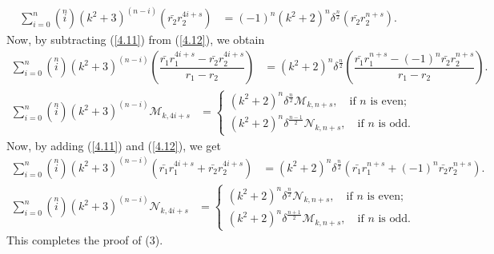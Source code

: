 \begin{align}\label{4.12}
\sum\limits_{i=0}^{n}\left( \stackrel{n}{i}\right)(k^2+3)^{(n-i)}(\bar{r_{2}}r_2^{4i+s})&=(-1)^n(k^2+2)^n\delta^{\frac{n}{2}}(\bar{r_{2}}r_2^{n+s}).
\end{align}
Now, by subtracting (\ref{4.11}) from (\ref{4.12}), we obtain \\
\begin{align*}
\sum\limits_{i=0}^{n}\left( \stackrel{n}{i}\right)(k^2+3)^{(n-i)}(\dfrac{\bar{r_{1}}r_1^{4i+s}-\bar{r_{2}}r_2^{4i+s}}{r_1-r_2})&=(k^2+2)^n\delta^{\frac{n}{2}}(\dfrac{\bar{r_{1}}r_1^{n+s}-(-1)^n\bar{r_{2}}r_2^{n+s}}{r_1-r_2}).
\end{align*}
\begin{align*}
\sum\limits_{i=0}^{n}\left( \stackrel{n}{i}\right)(k^2+3)^{(n-i)}\mathcal{M}_{k,4i+s}&=\begin{cases} 
(k^2+2)^n\delta^{\frac{n}{2}}\mathcal{M}_{k,n+s},\quad \text{if $n$ is even;}\\
(k^2+2)^n\delta^{\frac{n-1}{2}}\mathcal{N}_{k,n+s},\quad \text{if $n$ is odd.}\end{cases} 
\end{align*}
Now, by adding (\ref{4.11}) and (\ref{4.12}), we get \\
\begin{align*}
\sum\limits_{i=0}^{n}\left( \stackrel{n}{i}\right)(k^2+3)^{(n-i)}(\bar{r_{1}}r_1^{4i+s}+\bar{r_{2}}r_2^{4i+s})&=(k^2+2)^n\delta^{\frac{n}{2}}(\bar{r_{1}}r_1^{n+s}+(-1)^n\bar{r_{2}}r_2^{n+s}).
\end{align*}
\begin{align*}
\sum\limits_{i=0}^{n}\left( \stackrel{n}{i}\right)(k^2+3)^{(n-i)}\mathcal{N}_{k,4i+s}&=\begin{cases} 
(k^2+2)^n\delta^{\frac{n}{2}}\mathcal{N}_{k,n+s},\quad \text{if $n$ is even;}\\
(k^2+2)^n\delta^{\frac{n+1}{2}}\mathcal{M}_{k,n+s},\quad \text{if $n$ is odd.}
\end{cases}
\end{align*}
This completes the proof of (3).
